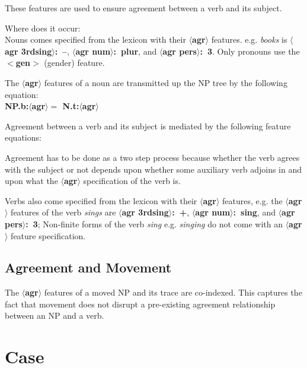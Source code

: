 These features are used to ensure agreement between a verb and its subject.

Where does it occur:\\ Nouns comes specified from the lexicon with
their {\bf $\langle$agr$\rangle$} features. e.g. {\em books} is {\bf
$\langle$agr 3rdsing$\rangle$:~--}, {\bf $\langle$agr num$\rangle$:~plur}, and {\bf $\langle$agr pers$\rangle$:~3}. Only pronouns use the
{\bf $<$gen$>$} (gender) feature.

The {\bf $\langle$agr$\rangle$} features of a noun are transmitted up the 
NP tree by the following equation:\\
{\bf NP.b:$\langle$agr$\rangle =$ N.t:$\langle$agr$\rangle$}

Agreement between a verb and its subject is mediated by the following feature
equations:




Agreement has to be done as a two step process because whether the
verb agrees with the subject or not depends upon whether some auxiliary verb
adjoins in and upon what the {\bf $\langle$agr$\rangle$} specification of 
the verb is. 

Verbs also come specified from the lexicon with their {\bf
$\langle$agr$\rangle$} features, e.g. the {\bf $\langle$agr$\rangle$}
features of the verb {\em sings} are {\bf $\langle$agr
3rdsing$\rangle$:~+}, {\bf $\langle$agr num$\rangle$:~sing}, and {\bf
$\langle$agr pers$\rangle$:~3}; Non-finite forms of the verb {\em
sing} e.g. {\em singing} do not come with an {\bf
$\langle$agr$\rangle$} feature specification.

\subsection{Agreement and Movement}
The {\bf $\langle$agr$\rangle$} features of a moved NP and its trace 
are co-indexed. This captures the fact that movement does not disrupt 
a pre-existing agreement relationship between an NP and a verb.




\section{Case}


